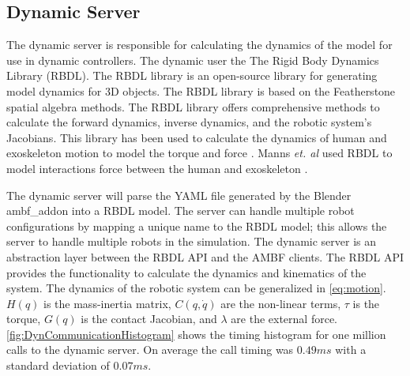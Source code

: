  



 
 
 
 
 \subsection{Dynamic Server}
 The dynamic server is responsible for calculating the dynamics of the model for use in dynamic controllers. The dynamic user the The Rigid Body Dynamics Library (RBDL)\cite{Felis2016}. The RBDL library is an open-source library for generating model dynamics for 3D objects. The RBDL library is based on the Featherstone spatial algebra methods. The RBDL library offers comprehensive methods to calculate the forward dynamics, inverse dynamics, and the robotic system's Jacobians. This library has been used to calculate the dynamics of human and exoskeleton motion to model the torque and force \cite{millard2017predicting} \cite{harant2017parameter}. Manns \textit{et. al} used RBDL to model interactions force between the human and exoskeleton \cite{manns2017motion}. 
 
 The dynamic server will parse the YAML file generated by the Blender ambf\_addon into a RBDL model. The server can handle multiple robot configurations by mapping a unique name to the RBDL model; this allows the server to handle multiple robots in the simulation. 
 The dynamic server is an abstraction layer between the RBDL API and the AMBF clients. The RBDL API provides the functionality to calculate the dynamics and kinematics of the system. The dynamics of the robotic system can be generalized in  \autoref{eq:motion}. $H(q)$ is the mass-inertia matrix, $C(q,\Dot{q})$ are the non-linear terms, $\tau$ is the torque,  $G(q)$ is the contact Jacobian, and $\lambda$ are the external force. \autoref{fig:DynCommunicationHistogram} shows the timing histogram for one million calls to the dynamic server. On average the call timing was $0.49ms$ with a standard deviation of $0.07ms$.  


